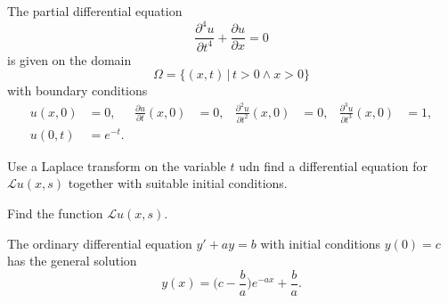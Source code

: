 The partial differential equation
\begin{equation}
\frac{\partial^4 u}{\partial t^4}
+
\frac{\partial u}{\partial x}
=
0
\label{50000013:dgl}
\end{equation}
is given on the domain
\[
\Omega = \{ (x,t)\,|\, t>0\wedge x > 0\}
\]
with boundary conditions
\begin{equation}
\begin{aligned}
u(x,0)&=0,
&
\frac{\partial u}{\partial t}(x,0)
&=
0,
&
\frac{\partial^2 u}{\partial t^2}(x,0)
&=
0,
&
\frac{\partial^3 u}{\partial t^3}(x,0)
&=1,
\\
u(0,t)&=e^{-t}.
\end{aligned}
\end{equation}
\begin{teilaufgaben}
\item
Use a Laplace transform on the variable $t$ udn find a differential
equation for
$\mathscr{L}u(x,s)$ together with suitable initial conditions.
\item
Find the function $\mathscr{L}u(x,s)$.
\end{teilaufgaben}

\begin{hinweis}
The ordinary differential equation $y'+ay=b$ with initial conditions
$y(0)=c$ has the general solution
\[
y(x) = \biggl(c-\frac{b}{a}\biggr)e^{-ax} + \frac{b}{a}.
\]
\end{hinweis}

